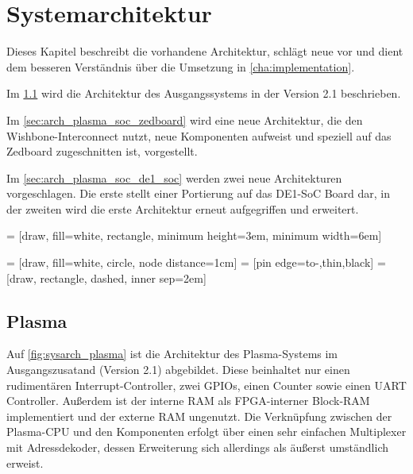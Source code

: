 \chapter{Systemarchitektur}
\label{cha:architecture}

Dieses Kapitel beschreibt die vorhandene Architektur, schlägt neue vor und dient dem besseren Verständnis über die Umsetzung in \cref{cha:implementation}.

Im \cref{sec:arch_plasma} wird die Architektur des Ausgangssystems in der Version 2.1 beschrieben.

Im \cref{sec:arch_plasma_soc_zedboard} wird eine neue Architektur, die den Wishbone-\gls{Interconnect} nutzt, neue Komponenten aufweist und speziell auf das Zedboard zugeschnitten ist, vorgestellt. 

Im \cref{sec:arch_plasma_soc_de1_soc} werden zwei neue Architekturen vorgeschlagen. Die erste stellt einer Portierung auf das DE1-SoC Board dar, in der zweiten wird die erste Architektur erneut aufgegriffen und erweitert. 

 = [draw, fill=white, rectangle, minimum height=3em, minimum width=6em]


 = [draw, fill=white, circle, node distance=1cm]
 = [pin edge={to-,thin,black}]
 = [draw, rectangle, dashed, inner sep=2em]

\section{Plasma}
\label{sec:arch_plasma}

Auf \cref{fig:sysarch_plasma} ist die Architektur des Plasma-Systems im Ausgangszusatand (Version 2.1) abgebildet. Diese beinhaltet nur einen rudimentären Interrupt-Controller, zwei \glspl{GPIO}, einen Counter sowie einen \gls{UART} Controller. Außerdem ist der interne \gls{RAM} als \gls{FPGA}-interner Block-\gls{RAM} implementiert und der externe \gls{RAM} ungenutzt. Die Verknüpfung zwischen der Plasma-CPU und den Komponenten erfolgt über einen sehr einfachen Multiplexer mit Adressdekoder, dessen Erweiterung sich allerdings als äußerst umständlich erweist. 

